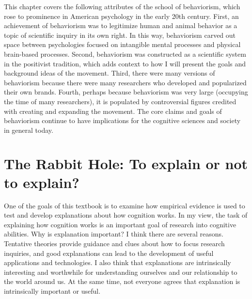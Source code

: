 \documentclass[
  oneside,
  12pt]{crumpbook}
\begin{document}
This chapter covers the following attributes of the school of behaviorism, which rose to prominence in American psychology in the early 20th century. First, an achievement of behaviorism was to legitimize human and animal behavior as a topic of scientific inquiry in its own right. In this way, behaviorism carved out space between psychologies focused on intangible mental processes and physical brain-based processes. Second, behaviorism was constructed as a scientific system in the positivist tradition, which adds context to how I will present the goals and background ideas of the movement. Third, there were many versions of behaviorism because there were many researchers who developed and popularized their own brands. Fourth, perhaps because behaviorism was very large (occupying the time of many researchers), it is populated by controversial figures credited with creating and expanding the movement. The core claims and goals of behaviorism continue to have implications for the cognitive sciences and society in general today.

\hypertarget{the-rabbit-hole-to-explain-or-not-to-explain}{%
\section{The Rabbit Hole: To explain or not to explain?}\label{the-rabbit-hole-to-explain-or-not-to-explain}}

One of the goals of this textbook is to examine how empirical evidence is used to test and develop explanations about how cognition works. In my view, the task of explaining how cognition works is an important goal of research into cognitive abilities. Why is explanation important? I think there are several reasons. Tentative theories provide guidance and clues about how to focus research inquiries, and good explanations can lead to the development of useful applications and technologies. I also think that explanations are intrinsically interesting and worthwhile for understanding ourselves and our relationship to the world around us. At the same time, not everyone agrees that explanation is intrinsically important or useful.
\end{document}
